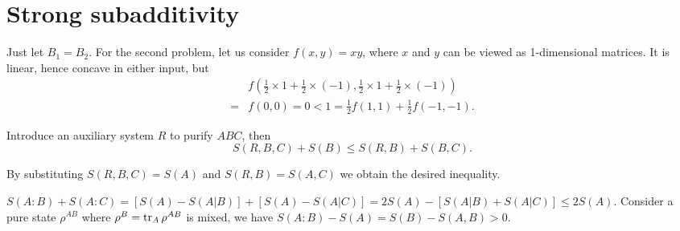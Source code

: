 \section{Strong subadditivity}

\ex Just let $B_1=B_2$.
For the second problem, let us consider $f(x, y) = xy$, where $x$ and $y$ can be viewed as 1-dimensional matrices.
It is linear, hence concave in either input, but
$$\begin{aligned}
    & f(\frac{1}{2}\times 1 + \frac{1}{2}\times (-1), \frac{1}{2}\times 1 + \frac{1}{2}\times (-1))
    \\ = & f(0, 0) = 0 < 1 = \frac{1}{2}f(1, 1) + \frac{1}{2}f(-1, -1).
\end{aligned}$$

\ex Introduce an auxiliary system $R$ to purify $ABC$, then
$$
    S(R,B,C)+S(B) \le S(R,B)+S(B,C).
$$

By substituting $S(R,B,C)=S(A)$ and $S(R,B)=S(A,C)$ we obtain the desired inequality.

\ex \todo

\ex $S(A:B)+S(A:C)=[S(A)-S(A|B)]+[S(A)-S(A|C)]=2S(A)-[S(A|B)+S(A|C)]\le 2S(A)$.
Consider a pure state $\rho^{AB}$ where $\rho^B=\operatorname{tr}_A\rho^{AB}$ is mixed, we have $S(A:B)-S(A)=S(B)-S(A,B)>0$.